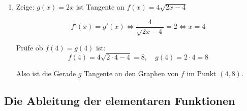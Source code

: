 \begin{enumerate}
	\item Zeige: \( g(x) = 2x \) ist Tangente an \( f(x) = 4\sqrt{2x - 4} \)

	      $$f'(x) = g'(x) \iff \dfrac{4}{\sqrt{2x - 4}} = 2 \iff x = 4$$

	      Prüfe ob $f(4) = g(4)$ ist:
	      $$ f(4) = 4\sqrt{2\cdot 4 -4} = 8, \quad g(4) = 2\cdot 4 = 8$$

	      Also ist die Gerade \( g \) Tangente an den Graphen von \( f \) im Punkt \( (4, 8) \).
\end{enumerate}
















































\clearpage
\subsection{Die Ableitung der elementaren Funktionen}
